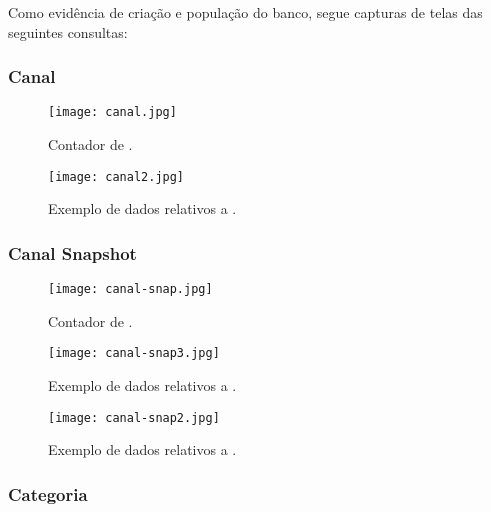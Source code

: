   Como evidência de criação e população do banco, segue capturas de telas das seguintes consultas:

\subsubsection{Canal}

  \begin{figure}[H]
    \centering
    \begin{minipage}[b]{0.25\textwidth}
        \centering
        \texttt{[image: canal.jpg]}
        \caption{Contador de .}
    \end{minipage}
    \hspace{0.05\textwidth}
    \begin{minipage}[b]{0.6\textwidth}
        \centering
        \texttt{[image: canal2.jpg]}
        \caption{Exemplo de dados relativos a .}
    \end{minipage}
  \end{figure}

\subsubsection{Canal Snapshot}

  \begin{figure}[H]
    \centering
    \begin{minipage}[b]{0.25\textwidth}
        \centering
        \texttt{[image: canal-snap.jpg]}
        \caption{Contador de .}
    \end{minipage}
    \hspace{0.05\textwidth}
    \begin{minipage}[b]{0.6\textwidth}
        \centering
        \texttt{[image: canal-snap3.jpg]}
        \caption{Exemplo de dados relativos a .}
    \end{minipage}
  \end{figure}

  \begin{figure}[H]
    \centering
    \texttt{[image: canal-snap2.jpg]}
    \caption{Exemplo de dados relativos a .}
  \end{figure}

\subsubsection{Categoria}


